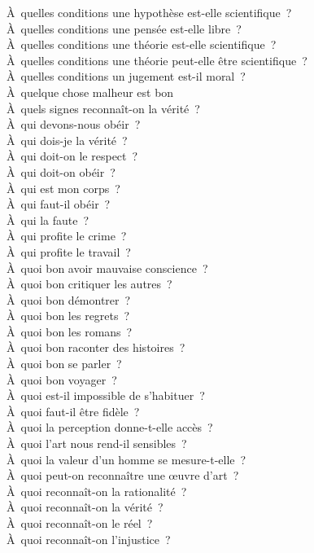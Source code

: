 \documentclass[a4paper,12pt]{article}
\begin{document}
À quelles conditions une hypothèse est-elle scientifique ? \\
À quelles conditions une pensée est-elle libre ? \\
À quelles conditions une théorie est-elle scientifique ? \\
À quelles conditions une théorie peut-elle être scientifique ? \\
À quelles conditions un jugement est-il moral ? \\
À quelque chose malheur est bon \\
À quels signes reconnaît-on la vérité ? \\
À qui devons-nous obéir ? \\
À qui dois-je la vérité ? \\
À qui doit-on le respect ? \\
À qui doit-on obéir ? \\
À qui est mon corps ? \\
À qui faut-il obéir ? \\
À qui la faute ? \\
À qui profite le crime ? \\
À qui profite le travail ? \\
À quoi bon avoir mauvaise conscience ? \\
À quoi bon critiquer les autres ? \\
À quoi bon démontrer ? \\
À quoi bon les regrets ? \\
À quoi bon les romans ? \\
À quoi bon raconter des histoires ? \\
À quoi bon se parler ? \\
À quoi bon voyager ? \\
À quoi est-il impossible de s'habituer ? \\
À quoi faut-il être fidèle ? \\
À quoi la perception donne-t-elle accès ? \\
À quoi l'art nous rend-il sensibles ? \\
À quoi la valeur d'un homme se mesure-t-elle ? \\
À quoi peut-on reconnaître une œuvre d'art ? \\
À quoi reconnaît-on la rationalité ? \\
À quoi reconnaît-on la vérité ? \\
À quoi reconnaît-on le réel ? \\
À quoi reconnaît-on l'injustice ? \\
\end{document}
